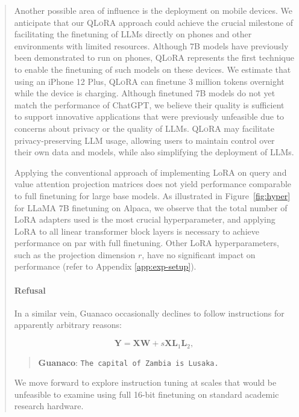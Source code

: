 \begin{quote}
Another possible area of influence is the deployment on mobile devices. We anticipate that our \textsc{QLoRA} approach could achieve the crucial milestone of facilitating the finetuning of LLMs directly on phones and other environments with limited resources. Although 7B models have previously been demonstrated to run on phones, \textsc{QLoRA} represents the first technique to enable the finetuning of such models on these devices. We estimate that using an iPhone 12 Plus, \textsc{QLoRA} can finetune 3 million tokens overnight while the device is charging. Although finetuned 7B models do not yet match the performance of ChatGPT, we believe their quality is sufficient to support innovative applications that were previously unfeasible due to concerns about privacy or the quality of LLMs. \textsc{QLoRA} may facilitate privacy-preserving LLM usage, allowing users to maintain control over their own data and models, while also simplifying the deployment of LLMs.

Applying the conventional approach of implementing LoRA on query and value attention projection matrices \citep{hu2021lora} does not yield performance comparable to full finetuning for large base models. As illustrated in Figure~\ref{fig:hyper} for LLaMA 7B finetuning on Alpaca, we observe that the total number of LoRA adapters used is the most crucial hyperparameter, and applying LoRA to all linear transformer block layers is necessary to achieve performance on par with full finetuning. Other LoRA hyperparameters, such as the projection dimension $r$, have no significant impact on performance (refer to Appendix \ref{app:exp-setup}).

\paragraph{Refusal} In a similar vein, {Guanaco} occasionally declines to follow instructions for apparently arbitrary reasons:

\begin{equation}
    \mathbf{Y} = \mathbf{X}\mathbf{W} + s\mathbf{X}\mathbf{L}_1\mathbf{L}_2,
\end{equation}

\begin{quote} 
    \textbf{Guanaco}:
    \texttt{The capital of Zambia is Lusaka.}
\end{quote}

We move forward to explore instruction tuning at scales that would be unfeasible to examine using full 16-bit finetuning on standard academic research hardware.


\end{quote}
